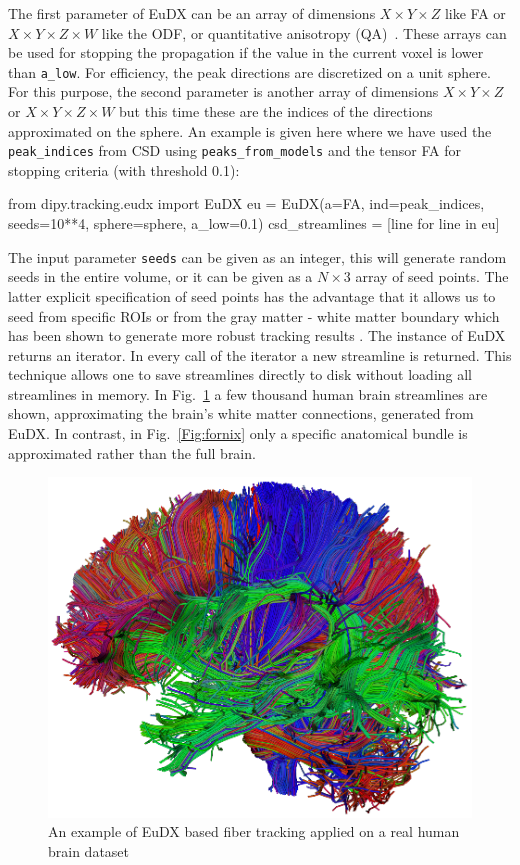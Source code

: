 \documentclass{bioinfo}
\begin{document}
The first parameter of EuDX can be an array of dimensions $X\times Y\times Z$
like FA or $X\times Y\times Z \times W$ like the ODF, or quantitative
anisotropy (QA)~\citep{yeh-etal:10}. These arrays can be used for stopping the
propagation if the value in the current voxel is lower than
\texttt{a\_low}. For efficiency, the peak directions are discretized on a unit
sphere. For this purpose, the second parameter is another array of dimensions
$X\times Y\times Z$ or $X\times Y\times Z\times W$ but this time these are the
indices of the directions approximated on the sphere. An example is given here
where we have used the \texttt{peak\_indices} from CSD using \texttt{peaks\_from\_models}
and the tensor FA for stopping criteria (with threshold 0.1):
\begin{python}
from dipy.tracking.eudx import EuDX
eu = EuDX(a=FA, ind=peak_indices, seeds=10**4,
          sphere=sphere, a_low=0.1)
csd_streamlines = [line for line in eu]
\end{python}
The input parameter \texttt{seeds} can be given as an integer, this will
generate random seeds in the entire volume, or it can be given as a $N\times 3$
array of seed points. The latter explicit specification of seed points has the
advantage that it allows us to seed from specific ROIs or from the gray matter
- white matter boundary which has been shown to generate more robust tracking
results \citep{Cote2013tractometer}. The instance of EuDX returns an
iterator. In every call of the iterator a new streamline is returned. This
technique allows one to save streamlines directly to disk without loading all
streamlines in memory. In Fig.~\ref{Fig:pretty_streamlines} a few thousand
human brain streamlines are shown, approximating the brain's white matter connections, 
generated from EuDX. In contrast, in Fig.~\ref{Fig:fornix} only a specific anatomical bundle is
approximated rather than the full brain.

\begin{figure}
\includegraphics[scale=0.75]{Figures/pretty_streamlines.eps}
\centering{}
\caption{An example of EuDX based fiber tracking applied on a real
  human brain dataset\label{Fig:pretty_streamlines}}
\end{figure}
\end{document}
